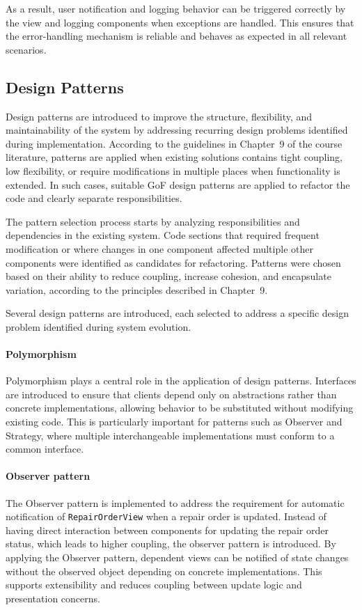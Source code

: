 \documentclass[a4paper]{scrartcl}
\begin{document}
As a result, user notification and logging behavior can be triggered correctly by the view and logging components when exceptions are handled. This ensures that the error-handling mechanism is reliable and behaves as expected in all relevant scenarios.
\fi

\subsection{Design Patterns}

Design patterns are introduced to improve the structure, flexibility, and maintainability of the system by addressing recurring design problems identified during implementation. According to the guidelines in Chapter~9 of the course literature, patterns are applied when existing solutions contains tight coupling, low flexibility, or require modifications in multiple places when functionality is extended. In such cases, suitable GoF design patterns are applied to refactor the code and clearly separate responsibilities.

The pattern selection process starts by analyzing responsibilities and dependencies in the existing system. Code sections that required frequent modification or where changes in one component affected multiple other components were identified as candidates for refactoring. Patterns were chosen based on their ability to reduce coupling, increase cohesion, and encapsulate variation, according to the principles described in Chapter~9.

Several design patterns are introduced, each selected to address a specific design problem identified during system evolution.

\paragraph{Polymorphism}
Polymorphism plays a central role in the application of design patterns. Interfaces are introduced to ensure that clients depend only on abstractions rather than concrete implementations, allowing behavior to be substituted without modifying existing code. This is particularly important for patterns such as Observer and Strategy, where multiple interchangeable implementations must conform to a common interface.

\paragraph{Observer pattern}
The Observer pattern is implemented to address the requirement for automatic notification of \texttt{RepairOrderView} when a repair order is updated. Instead of having direct interaction between components for updating the repair order status, which leads to higher coupling, the observer pattern is introduced. By applying the Observer pattern, dependent views can be notified of state changes without the observed object depending on concrete implementations. This supports extensibility and reduces coupling between update logic and presentation concerns. 
\end{document}
